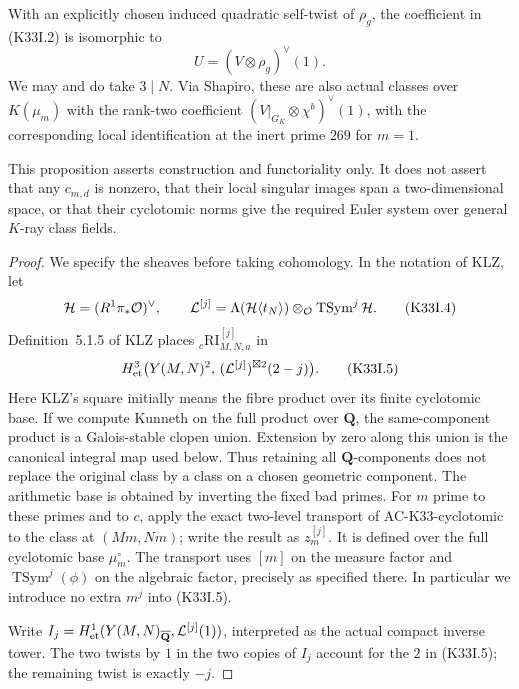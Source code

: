 \begin{proposition}
With an explicitly chosen induced quadratic self-twist of \(\rho_g\),
the coefficient in (K33I.2) is isomorphic to
\[
 U=(V\otimes\rho_g)^\vee(1).                       \tag{K33I.3}
\]
We may and do take \(3\mid N\).  Via Shapiro, these are also actual
classes over \(K(\mu_m)\) with the rank-two coefficient
\((V|_{G_K}\otimes\chi^b)^\vee(1)\), with the corresponding
local identification at the inert prime \(269\) for \(m=1\).

This proposition asserts construction and functoriality only.
It does not assert that any \(c_{m,d}\) is nonzero, that their local
singular images span a two-dimensional space, or that their cyclotomic
norms give the required Euler system over general \(K\)-ray class fields.
\end{proposition}

\begin{proof}
We specify the sheaves before taking cohomology.  In the notation of
KLZ, let
\[
 {\cal H}=(R^1\pi_*\mathcal O)^\vee,\qquad
 {\cal L}^{[j]}
 =\Lambda({\cal H}\langle t_N\rangle)
       \otimes_{\mathcal O}\operatorname{TSym}^j{\cal H}.
                                                               \tag{K33I.4}
\]
Definition~5.1.5 of KLZ places
\({}_c\mathrm{RI}^{[j]}_{M,N,a}\) in
\[
 H^3_{\rm et}\bigl(Y(M,N)^2,\,
       ({\cal L}^{[j]})^{\boxtimes2}(2-j)\bigr).    \tag{K33I.5}
\]
Here KLZ's square initially means the fibre product over its finite
cyclotomic base.  If we compute Kunneth on the full product over
\(\mathbf Q\), the same-component product is a Galois-stable clopen
union.  Extension by zero along this union is the canonical integral
map used below.  Thus retaining all \(\mathbf Q\)-components does not
replace the original class by a class on a chosen geometric component.
The arithmetic base is obtained by inverting the fixed bad primes.
For \(m\) prime to these primes and to \(c\), apply the exact two-level
transport of AC-K33-cyclotomic to the class at \((Mm,Nm)\); write the
result as \(z_m^{[j]}\).  It is defined over the full cyclotomic base
\(\mu_m^\circ\).  The transport uses \([m]\) on the measure factor and
\(\operatorname{TSym}^j(\phi)\) on the algebraic factor, precisely as
specified there.  In particular we introduce no extra \(m^j\) into
(K33I.5).

Write \(I_j=H^1_{\rm et}(Y(M,N)_{\overline{\mathbf Q}},
{\cal L}^{[j]}(1))\), interpreted as the actual compact inverse tower.
The two twists by \(1\) in the two copies of \(I_j\) account for the
\(2\) in (K33I.5); the remaining twist is exactly \(-j\).


\end{proof}
